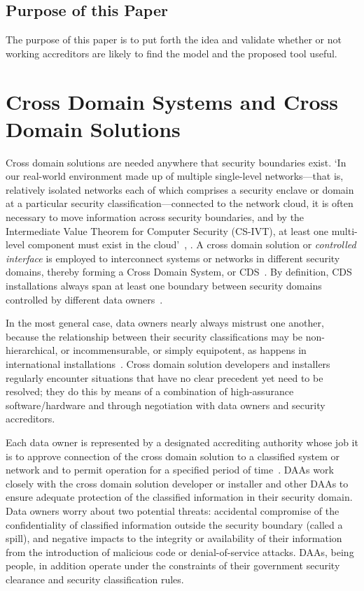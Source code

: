 \documentclass{llncs}
\begin{document}
\subsection{Purpose of this Paper}

The purpose of this paper
is to put forth the idea and validate whether or not working accreditors
are likely to find the model and the proposed tool useful.

\section{Cross Domain Systems and Cross Domain Solutions}

Cross domain solutions are needed anywhere that security boundaries exist.
`In our real-world environment made up of multiple single-level networks---that is,
relatively isolated networks each of which comprises a security enclave or
domain at a particular security classification---connected to the
network cloud, it is often necessary to move information across security
boundaries, and by the Intermediate Value Theorem for Computer Security (CS-IVT),
at least one multi-level component must exist in the
cloud'~\cite[]{Bell2005b}, \cite{Loughry2012b}.  A cross domain
solution or
\emph{controlled interface} is employed to interconnect systems or networks
in different security domains, thereby forming a Cross Domain System,
or CDS~\cite{DCID-6/3a}.
By definition, CDS installations always span at least one boundary between
security domains controlled by different data owners~\cite{Loughry2010a}.

In the most general case, data owners nearly always mistrust one another,
because the relationship between their security classifications may be
non-hierarch\-ical, or incommensurable, or simply equipotent, as happens in
international
installations~\cite{TSOL_2.5_CMW}.  Cross domain solution developers and installers regularly
encounter situations that have no clear precedent yet need to be resolved;
they do this by means of a combination of high-assurance
software/hardware and through negotiation with data owners and security accreditors.

Each data owner is represented by a designated accrediting authority
whose job it is to approve connection of the cross domain solution to
a classified system or network and to permit operation for a specified period of
time~\cite{NIST-SP-800-37,NIST-SP-800-53A2,DIACAP,NIST-SP800-53r3}.
DAAs work closely with the cross domain solution developer or installer and other DAAs to ensure
adequate protection of the classified information in their security domain.
Data owners worry about two potential threats: accidental compromise of the confidentiality of
classified information outside the security boundary (called a spill),
and negative impacts to the integrity or availability of their information
from the introduction of malicious code or denial-of-service attacks.  DAAs,
being people, 
in addition operate under the constraints of their government security clearance and
security classification rules.
\end{document}

